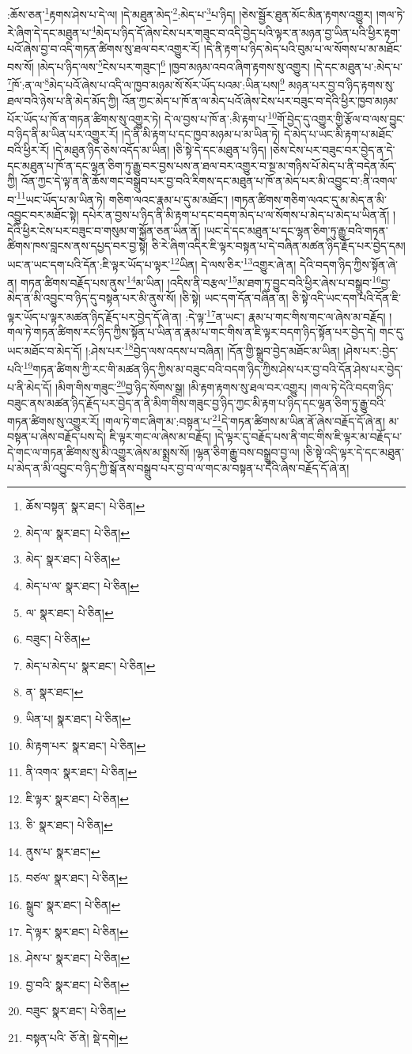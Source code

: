 :ཆོས་ཅན་\footnote{ཆོས་བསྟན་  སྣར་ཐང་།  པེ་ཅིན། }རྟགས་ཤེས་པ་དེ་ལ། །དེ་མཐུན་མེད་\footnote{མེད་ལ་  སྣར་ཐང་།  པེ་ཅིན། }:མེད་པ་\footnote{མེད་  སྣར་ཐང་།  པེ་ཅིན། }པ་ཉིད། །ཅེས་སྦྱོར་ཐུན་མོང་མིན་རྟགས་འགྱུར། །གལ་ཏེ་རེ་ཞིག་དེ་དང་མཐུན་པ་\footnote{མེད་པ་ལ་  སྣར་ཐང་།  པེ་ཅིན། }མེད་པ་ཉིད་དོ་ཞེས་ངེས་པར་གཟུང་བ་འདི་བྱེད་པའི་ལྟར་ན་མཉན་བྱ་ཡིན་པའི་ཕྱིར་རྟག་པའོ་ཞེས་བྱ་བ་འདི་གཏན་ཚིགས་སུ་ཐལ་བར་འགྱུར་རོ། །དེ་ནི་རྟག་པ་ཉིད་མེད་པའི་བུམ་པ་ལ་སོགས་པ་མ་མཐོང་བས་སོ། །མེད་པ་ཉིད་ལས་\footnote{ལ་  སྣར་ཐང་།  པེ་ཅིན། }ངེས་པར་གཟུང་།\footnote{བཟུང་།  པེ་ཅིན། } །ཁྱབ་མཉམ་འབའ་ཞིག་རྟགས་སུ་འགྱུར། །དེ་དང་མཐུན་པ་:མེད་པ་\footnote{མེད་པ་མེད་པ་  སྣར་ཐང་།  པེ་ཅིན། }ཁོ་:ན་ལ་\footnote{ན་  སྣར་ཐང་། }མེད་པའོ་ཞེས་པ་འདི་ལ་ཁྱབ་མཉམ་སོ་སོར་ཡོད་པའམ་:ཡིན་པས།\footnote{ཡིན་པ།  སྣར་ཐང་།  པེ་ཅིན། } མཉན་པར་བྱ་བ་ཉིད་རྟགས་སུ་ཐལ་བའི་ཉེས་པ་ནི་མེད་མོད་ཀྱི། འོན་ཀྱང་མེད་པ་ཁོ་ན་ལ་མེད་པའོ་ཞེས་ངེས་པར་བཟུང་བ་དེའི་ཕྱིར་ཁྱབ་མཉམ་པོར་ཡོད་པ་ཁོ་ན་གཏན་ཚིགས་སུ་འགྱུར་ཏེ། དེ་ལ་བྱས་པ་ཁོ་ན་:མི་རྟག་པ་\footnote{མི་རྟག་པར་  སྣར་ཐང་།  པེ་ཅིན། }གོ་བྱེད་དུ་འགྱུར་གྱི་རྩོལ་བ་ལས་བྱུང་བ་ཉིད་ནི་མ་ཡིན་པར་འགྱུར་རོ། །དེ་ནི་མི་རྟག་པ་དང་ཁྱབ་མཉམ་པ་མ་ཡིན་ཏེ། དེ་མེད་པ་ཡང་མི་རྟག་པ་མཐོང་བའི་ཕྱིར་རོ། །དེ་མཐུན་ཉིད་ཅེས་འདོད་མ་ཡིན། །ཅི་སྟེ་དེ་དང་མཐུན་པ་ཉིད། །ཅེས་ངེས་པར་བཟུང་བར་བྱེད་ན་དེ་དང་མཐུན་པ་ཁོ་ན་དང་ལྷན་ཅིག་ཏུ་རྒྱུ་བར་བྱས་པས་ན་ཐལ་བར་འགྱུར་བ་སྔ་མ་གཉིས་པོ་མེད་པ་ནི་བདེན་མོད་ཀྱི། འོན་ཀྱང་དེ་ལྟ་ན་ནི་ཆོས་གང་བསྒྲུབ་པར་བྱ་བའི་རིགས་དང་མཐུན་པ་ཁོ་ན་མེད་པར་མི་འབྱུང་བ་:ནི་འགལ་བ་\footnote{ནི་འགའ་  སྣར་ཐང་།  པེ་ཅིན། }ཡང་ཡོད་པ་མ་ཡིན་ཏེ། གཅིག་ལའང་རྣམ་པ་དུ་མ་མཐོང་། །གཏན་ཚིགས་གཅིག་ལའང་དུ་མ་མེད་ན་མི་འབྱུང་བར་མཐོང་སྟེ། དཔེར་ན་བྱས་པ་ཉིད་ནི་མི་རྟག་པ་དང་བདག་མེད་པ་ལ་སོགས་པ་མེད་པ་མེད་པ་ཡིན་ནོ། །དེའི་ཕྱིར་ངེས་པར་བཟུང་བ་གསུམ་ག་སྐྱོན་ཅན་ཡིན་ནོ། །ཡང་དེ་དང་མཐུན་པ་དང་ལྷན་ཅིག་ཏུ་རྒྱུ་བའི་གཏན་ཚིགས་ཁས་བླངས་ནས་དཔྱད་བར་བྱ་སྟེ། ཅི་རེ་ཞིག་འདིར་ཇི་ལྟར་བསྟན་པ་དེ་བཞིན་མཚན་ཉིད་རྗོད་པར་བྱེད་དམ། ཡང་ན་ཡང་དག་པའི་དོན་:ཇི་ལྟར་ཡོད་པ་ལྟར་\footnote{ཇི་ལྟར་  སྣར་ཐང་།  པེ་ཅིན། }ཡིན། དེ་ལས་ཅིར་\footnote{ཅི་  སྣར་ཐང་།  པེ་ཅིན། }འགྱུར་ཞེ་ན། དེའི་བདག་ཉིད་ཀྱིས་སྟོན་ཞེ་ན། གཏན་ཚིགས་བརྗོད་པས་ནུས་\footnote{ནུས་པ་  སྣར་ཐང་། }མ་ཡིན། །འདིས་ནི་བརྩལ་\footnote{བཙལ་  སྣར་ཐང་།  པེ་ཅིན། }མ་ཐག་ཏུ་བྱུང་བའི་ཕྱིར་ཞེས་པ་བསྒྲུབ་\footnote{སྒྲུབ་  སྣར་ཐང་།  པེ་ཅིན། }བྱ་མེད་ན་མི་འབྱུང་བ་ཉིད་དུ་བསྟན་པར་མི་ནུས་སོ། །ཅི་སྟེ། ཡང་དག་དོན་བཞིན་ན། ཅི་སྟེ་འདི་ཡང་དག་པའི་དོན་ཇི་ལྟར་ཡོད་པ་ལྟར་མཚན་ཉིད་རྗོད་པར་བྱེད་དོ་ཞེ་ན། :དེ་ལྟ་\footnote{དེ་ལྟར་  སྣར་ཐང་།  པེ་ཅིན། }ན་ཡང་། རྣམ་པ་གང་གིས་གང་ལ་ཞེས་མ་བརྗོད། །གལ་ཏེ་གཏན་ཚིགས་རང་ཉིད་ཀྱིས་སྟོན་པ་ཡིན་ན་རྣམ་པ་གང་གིས་ན་ཇི་ལྟར་བདག་ཉིད་སྟོན་པར་བྱེད་དེ། གང་དུ་ཡང་མཐོང་བ་མེད་དོ། །:ཤེས་པར་\footnote{ཤེས་པ་  སྣར་ཐང་།  པེ་ཅིན། }བྱེད་ལས་འདས་པ་བཞིན། །དོན་གྱི་སྒྲུབ་བྱེད་མཐོང་མ་ཡིན། །ཤེས་པར་:བྱེད་པའི་\footnote{བྱ་བའི་  སྣར་ཐང་།  པེ་ཅིན། }གཏན་ཚིགས་ཀྱི་རང་གི་མཚན་ཉིད་ཀྱིས་མ་བཟུང་བའི་བདག་ཉིད་ཀྱིས་ཤེས་པར་བྱ་བའི་དོན་ཤེས་པར་བྱེད་པ་ནི་མེད་དོ། །མིག་གིས་གཟུང་\footnote{བཟུང་  སྣར་ཐང་།  པེ་ཅིན། }བྱ་ཉིད་སོགས་སྒྲ། །མི་རྟག་རྟགས་སུ་ཐལ་བར་འགྱུར། །གལ་ཏེ་དེའི་བདག་ཉིད་བཟུང་ནས་མཚན་ཉིད་རྗོད་པར་བྱེད་ན་ནི་མིག་གིས་གཟུང་བྱ་ཉིད་ཀྱང་མི་རྟག་པ་ཉིད་དང་ལྷན་ཅིག་ཏུ་རྒྱུ་བའི་གཏན་ཚིགས་སུ་འགྱུར་རོ། །གལ་ཏེ་གང་ཞིག་མ་:བསྟན་པ་\footnote{བསྟན་པའི་  ཅོ་ནེ།  སྡེ་དགེ། }དེ་གཏན་ཚིགས་མ་ཡིན་ནོ་ཞེས་བརྗོད་དོ་ཞེ་ན། མ་བསྟན་པ་ཞེས་བརྗོད་པས་དེ། ཇི་ལྟར་གང་ལ་ཞེས་མ་བརྗོད། །དེ་ལྟར་དུ་བརྗོད་པས་ནི་གང་གིས་ཇི་ལྟར་མ་བརྗོད་པ་དེ་གང་ལ་གཏན་ཚིགས་སུ་མི་འགྱུར་ཞེས་མ་སྨྲས་སོ། །ལྷན་ཅིག་རྒྱུ་བས་བསྒྲུབ་བྱ་ལ། །ཅི་སྟེ་འདི་ལྟར་དེ་དང་མཐུན་པ་མེད་ན་མི་འབྱུང་བ་ཉིད་ཀྱི་སྒོ་ནས་བསྒྲུབ་པར་བྱ་བ་ལ་གང་མ་བསྟན་པ་དེའི་ཞེས་བརྗོད་དོ་ཞེ་ན། 